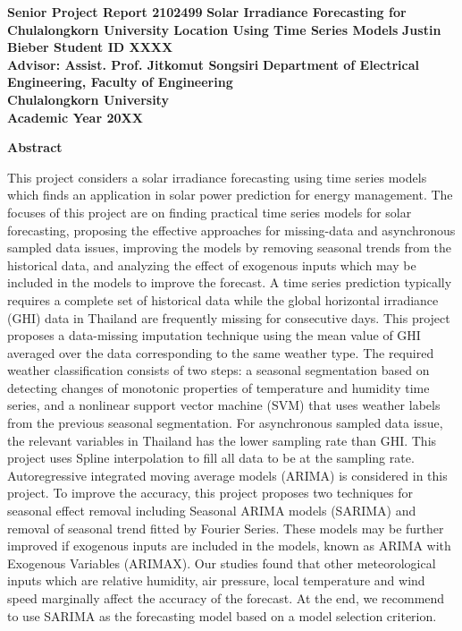 \documentclass[11pt,a4paper]{article}
\begin{document}
\thispagestyle{empty}
\begin{center}
\doublespacing
{\Large \bf Senior Project Report 2102499}
\vfill
{
\Large \bf
Solar Irradiance Forecasting for Chulalongkorn University Location Using Time Series Models
}
\vfill
{\Large \bf Justin Bieber Student ID XXXX} \\[2ex]
{\Large \bf Advisor: Assist. Prof. Jitkomut Songsiri}
\vfill
{\Large \bf Department of Electrical Engineering, Faculty of Engineering} \\[2ex]
{\Large \bf Chulalongkorn University} \\[2ex]
{\Large \bf Academic Year 20XX}
\end{center}

\newpage
\thispagestyle{empty}
\begin{center}
\textbf{Abstract}
\end{center}

This project considers a solar irradiance forecasting using time series models which finds an application in solar power prediction for energy management. The focuses of this project are on finding practical time series models for solar forecasting, proposing the effective approaches for missing-data and asynchronous sampled data issues, improving the models by removing seasonal trends from the historical data, and analyzing the effect of exogenous inputs which may be included in the models to improve the forecast. A time series prediction typically requires a complete set of historical data while the global horizontal irradiance (GHI) data in Thailand are frequently missing for consecutive days. This project proposes a data-missing imputation technique using the mean value of GHI averaged over the data corresponding to the same weather type. The required weather classification consists of two steps: a seasonal segmentation based on detecting changes of monotonic properties of temperature and humidity time series, and a nonlinear support vector machine (SVM) that uses weather labels from the previous seasonal segmentation. For asynchronous sampled data issue, the relevant variables in Thailand has the lower sampling rate than GHI. This project uses Spline interpolation to fill all data to be at the sampling rate. Autoregressive integrated moving average models (ARIMA) is considered in this project. To improve the accuracy, this project proposes two techniques for seasonal effect removal including Seasonal ARIMA models (SARIMA) and removal of seasonal trend fitted by Fourier Series. These models may be further improved if exogenous inputs are included in the models, known as ARIMA with Exogenous Variables (ARIMAX). Our studies found that other meteorological inputs which are relative humidity, air pressure, local temperature and wind speed marginally affect the accuracy of the forecast. At the end, we recommend to use SARIMA as the forecasting model based on a model selection criterion.
\end{document}
